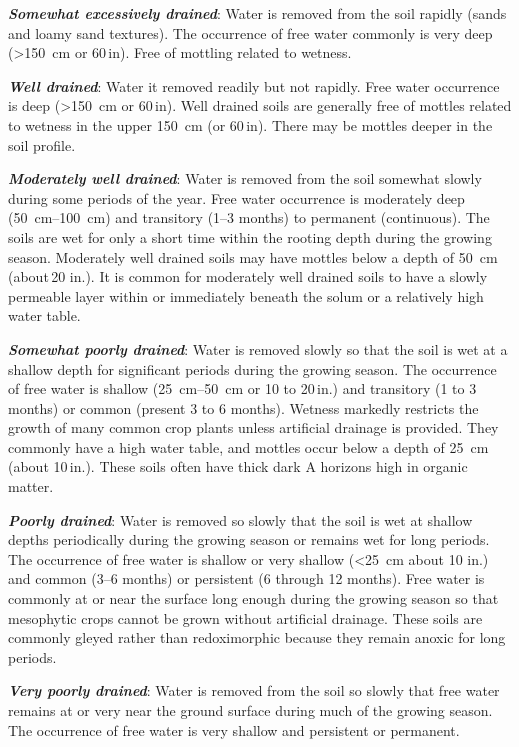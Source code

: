 \documentclass[letterpaper, 12pt]{article}
\begin{document}
\textbf{\textit{Somewhat excessively drained}}: Water is removed from the soil rapidly (sands and loamy sand textures). The occurrence of free water commonly is very deep (\textgreater{}\qty{150}{cm} or 60\,in). Free of mottling related to wetness.

\textbf{\textit{Well drained}}: Water it removed readily but not rapidly. Free water occurrence is deep (\textgreater{}\qty{150}{cm} or 60\,in). Well drained soils are generally free of mottles related to wetness in the upper \qty{150}{cm} (or 60\,in). There may be mottles deeper in the soil profile.

\textbf{\textit{Moderately well drained}}: Water is removed from the soil somewhat slowly during some periods of the year. Free water occurrence is moderately deep (\qtyrange{50}{100}{cm}) and transitory (\numrange{1}{3} months) to permanent (continuous). The soils are wet for only a short time within the rooting depth during the growing season. Moderately well drained soils may have mottles below a depth of \qty{50}{cm} (about\,20 in.). It is common for moderately well drained soils to have a slowly permeable layer within or immediately beneath the solum or a relatively high water table.

\textbf{\textit{Somewhat poorly drained}}: Water is removed slowly so that the soil is wet at a shallow depth for significant periods during the growing season. The occurrence of free water is shallow (\qtyrange{25}{50}{cm} or 10 to 20\,in.) and transitory (1 to 3 months) or common (present 3 to 6 months). Wetness markedly restricts the growth of many common crop plants unless artificial drainage is provided. They commonly have a high water table, and mottles occur below a depth of \qty{25}{cm} (about 10\,in.). These soils often have thick dark A horizons high in organic matter.

\textbf{\textit{Poorly drained}}: Water is removed so slowly that the soil is wet at shallow depths periodically during the growing season or remains wet for long periods. The occurrence of free water is shallow or very shallow (\textless{}\qty{25}{cm} about 10 in.) and common (\numrange{3}{6} months) or persistent (6 through 12 months). Free water is commonly at or near the surface long enough during the growing season so that mesophytic crops cannot be grown without artificial drainage. These soils are commonly gleyed rather than redoximorphic  because they remain anoxic for long periods.

\textbf{\textit{Very poorly drained}}: Water is removed from the soil so slowly that free water remains at or very near the ground surface during much of the growing season. The occurrence of free water is very shallow and persistent or permanent.
\end{document}
